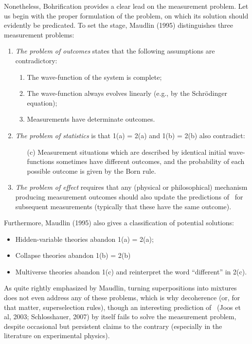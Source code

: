 \documentclass[12pt]{article}
\newcommand{\mmp}{measurement problem}
\begin{document}
 Nonetheless,  Bohrification provides a clear lead on the \mmp. 
 Let us begin with the proper formulation of the problem, on which its  solution should evidently be predicated.
 To set the stage,  Maudlin (1995) distinguishes three \mmp s:
 \begin{enumerate}
\item \emph{The problem of outcomes} states that the following assumptions are contradictory:
\begin{enumerate}
\item The wave-function of the system is complete;
\item The wave-function always evolves linearly (e.g., by the Schr\"{o}dinger equation);
\item Measurements have determinate outcomes.
\end{enumerate}
\item  \emph{The problem of statistics} is that 1(a) = 2(a) and 1(b) = 2(b) also contradict:
\begin{enumerate}
\item[(c)] Measurement situations which are described by identical initial wave-functions sometimes have different outcomes, and the probability of each possible outcome is given by the Born rule.
\end{enumerate}
\item  \emph{The problem of effect} requires that any (physical or philosophical) mechanism producing measurement outcomes should also update the predictions of \qm\ for subsequent measurements (typically that these have the same outcome). 
\end{enumerate}
Furthermore, Maudlin (1995) also gives a classification of potential solutions: 
\begin{itemize}
\item Hidden-variable theories abandon 1(a) = 2(a);
\item Collapse theories abandon 1(b) = 2(b)
\item Multiverse theories abandon 1(c) and reinterpret the word ``different'' in 2(c).
\end{itemize}
As quite rightly emphasized by Maudlin, turning superpositions  into mixtures 
does not even address any of these problems, which is why  decoherence (or, for that matter, superselection rules),
though an interesting prediction of \qm\ (Joos et al, 2003; Schlosshauer, 2007) by itself fails to solve the \mmp, despite occasional but persistent claims to the contrary (especially in the literature on experimental physics).  
\end{document}
